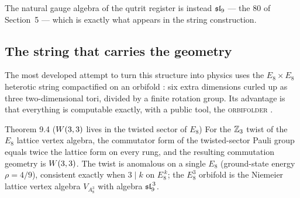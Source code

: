 The natural gauge algebra of the qutrit register is instead $\mathfrak{sl}_9$ --- the $80$ of
Section~5 --- which is exactly what appears in the string construction.

\subsection{The string that carries the geometry}
\label{sec:strings}

The most developed attempt to turn this structure into physics uses the
$E_8\times E_8$ heterotic string compactified on an orbifold \cite{DHVW}: six extra dimensions curled
up as three two-dimensional tori, divided by a finite rotation group. Its advantage is
that everything is computable exactly, with a public tool, the \textsc{orbifolder}
\cite{Orbifolder}.

\begin{result}{Theorem 9.4 ($W(3,3)$ lives in the twisted sector of $E_8$) \hfill \tierC}
For the $\mathbb{Z}_3$ twist of the $E_8$ lattice vertex algebra, the commutator form of the
twisted-sector Pauli group equals twice the lattice form on every rung, and the resulting
commutation geometry is $W(3,3)$. The twist is anomalous on a single $E_8$ (ground-state energy
$\rho=4/9$), consistent exactly when $3\mid k$ on $E_8^{\,k}$; the $E_8^3$ orbifold is the
Niemeier lattice vertex algebra $V_{A_8^3}$ with algebra $\mathfrak{sl}_9^{\,3}$.
\end{result}

